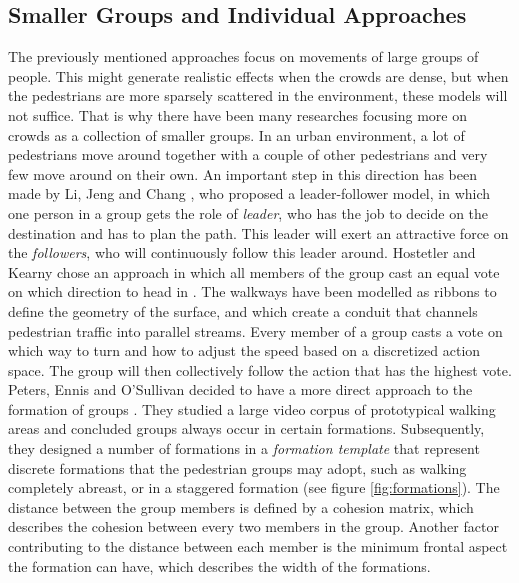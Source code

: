 \documentclass[11pt, a4paper]{book}
\begin{document}
\subsection{Smaller Groups and Individual Approaches}
The previously mentioned approaches focus on movements of large groups of people. This might generate realistic effects when the crowds are dense, but when the pedestrians are more sparsely scattered in the environment, these models will not suffice. That is why there have been many researches focusing more on crowds as a collection of smaller groups. In an urban environment, a lot of pedestrians move around together with a couple of other pedestrians and very few move around on their own. An important step in this direction has been made by Li, Jeng and Chang \cite{leaderfollower}, who proposed a leader-follower model, in which one person in a group gets the role of \emph{leader}, who has the job to decide on the destination and has to plan the path. This leader will exert an attractive force on the \emph{followers}, who will continuously follow this leader around. Hostetler and Kearny chose an approach in which all members of the group cast an equal vote on which direction to head in \cite{Hostetler02strollingdown}. The walkways have been modelled as ribbons to define the geometry of the surface, and which create a conduit that channels pedestrian traffic into parallel streams. Every member of a group casts a vote on which way to turn and how to adjust the speed based on a discretized action space. The group will then collectively follow the action that has the highest vote. Peters, Ennis and O'Sullivan decided to have a more direct approach to the formation of groups \cite{10.1109MCG.2009.69}. They studied a large video corpus of prototypical walking areas and concluded groups always occur in certain formations. Subsequently, they designed a number of formations in a \emph{formation template} that represent discrete formations that the pedestrian groups may adopt, such as walking completely abreast, or in a staggered formation (see figure \ref{fig:formations}). The distance between the group members is defined by a cohesion matrix, which describes the cohesion between every two members in the group. Another factor contributing to the distance between each member is the minimum frontal aspect the formation can have, which describes the width of the formations.
\end{document}
